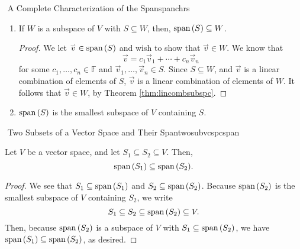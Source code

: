 \begin{theorem}{\Stop\,\,A Complete Characterization of the Span}{spanchrs}
\begin{enumerate}
\begin{proof}
\begin{equation*}
                    \end{equation*}
                    which is a linear combination of the elements in \(S\), meaning that it is in \(\Span(S)\).
                \end{proof}
                \item If \(W\) is a subspace of \(V\) with \(S\subseteq W\), then, \(\text{span\,}(S)\subseteq W\).
                \begin{proof}
                    We let \(\overset{_{\rightharpoonup}}{v}\in\text{span\,}(S)\) and wish to show that \(\vec{v}\in W\). We know that
                    \begin{equation*}
                        \vec{v}=c_1\vec{v}_1+\cdots+c_n\vec{v}_n
                    \end{equation*}
                    for some \(c_1,\ldots,c_n\in\mathbb{F}\) and \(\vec{v}_1,\ldots,\vec{v}_n\in S\). Since \(S\subseteq W\), and \(\vec{v}\) is a linear combination of elements of \(S\), \(\vec{v}\) is a linear combination of elements of \(W\). It follows that \(\vec{v}\in W\), by Theorem \ref{thm:lincombsubspc}.
                \end{proof}
                \item \(\Span(S)\) is the smallest subspace of \(V\) containing \(S\). 
            \end{enumerate}

        \end{theorem}
        \begin{theorem}{\Stop\,\,Two Subsets of a Vector Space and Their Span}{twosubvcspcspan}
        
            Let \(V\) be a vector space, and let \(S_1\subseteq S_2\subseteq V\). Then,
            \begin{equation*}
                \text{span\,}(S_1)\subseteq\text{span\,}(S_2).
            \end{equation*}
            \begin{proof}
                We see that \(S_1\subseteq\text{span\,}(S_1)\) and \(S_2\subseteq\text{span\,}(S_2)\). Because \(\text{span\,}(S_2)\) is the smallest subspace of \(V\) containing \(S_2\), we write
                \begin{equation*}
                    S_1\subseteq S_2\subseteq\text{span\,}(S_2)\subseteq V.
                \end{equation*}
                Then, because \(\text{span\,}(S_2)\) is a subspace of \(V\) with \(S_1\subseteq\text{span\,}(S_2)\), we have \(\text{span\,}(S_1)\subseteq\text{span\,}(S_2)\), as desired.
            \end{proof}
        \end{theorem}
